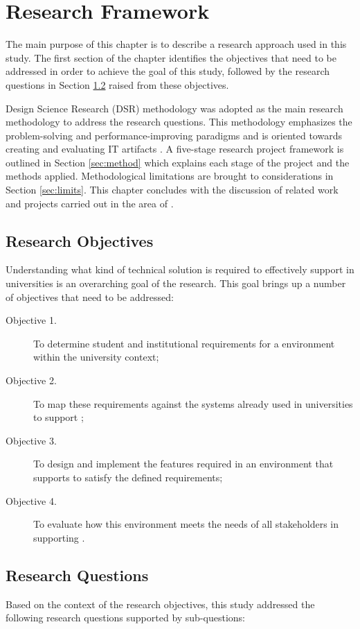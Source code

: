 \chapter{Research Framework\label{cha:method}}
The main purpose of this chapter is to describe a research approach used in this
study. The first section of the chapter identifies the objectives that need to
be addressed in order to achieve the goal of this study, followed by the research
questions in Section \ref{sec:questions} raised from these objectives.

Design Science Research (DSR) methodology was adopted as the main research
methodology to address the research questions. This methodology emphasizes the
problem-solving and performance-improving paradigms and is oriented towards
creating and evaluating IT artifacts \citep{Hevner2004}. A five-stage research
project framework is outlined in Section \ref{sec:method} which explains each
stage of the project and the methods applied. Methodological limitations are
brought to considerations in Section \ref{sec:limits}. This chapter concludes
with the discussion of related work and projects carried out in the area of
\LLLsn.

\section{Research Objectives}

Understanding what kind of technical solution is required to effectively support
\LLLs in universities is an overarching goal of the research. This goal brings
up a number of objectives that need to be addressed:
\begin{description}
  \item[Objective 1.] To determine student and institutional requirements for a
  \LLLs environment within the university context;
  \item[Objective 2.] To map these requirements against the systems already used
  in universities to support \LLLsn;
  \item[Objective 3.] To design and implement the features required in an
  environment that supports \LLLs to satisfy the defined requirements;
  \item[Objective 4.] To evaluate how this environment meets the needs of all
  stakeholders in supporting \LLLsn.
\end{description}

\section{Research Questions}
\label{sec:questions}
Based on the context of the research objectives, this study addressed the
following research questions supported by sub-questions:

